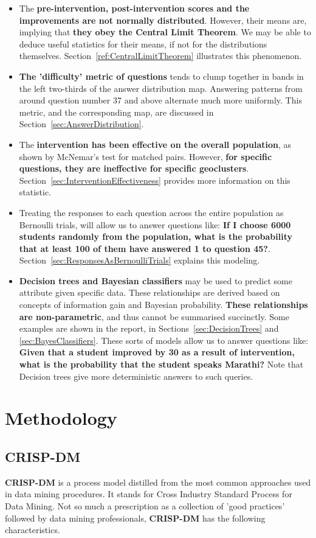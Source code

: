 \documentclass[10pt]{article}
\begin{document}
\begin{itemize}
\item The \textbf{pre-intervention, post-intervention scores and the improvements are not normally distributed}. However, their means are, implying that \textbf{they obey the Central Limit Theorem}. We may be able to deduce useful statistics for their means, if not for the distributions themselves. Section~\ref{ref:CentralLimitTheorem} illustrates this phenomenon.
\item \textbf{The 'difficulty' metric of questions} tends to clump together in bands in the left two-thirds of the answer distribution map. Answering patterns from around question number 37 and above alternate much more uniformly. This metric, and the corresponding map, are discussed in Section~\ref{sec:AnswerDistribution}.
\item The \textbf{intervention has been effective on the overall population}, as shown by McNemar's test for matched pairs. However, \textbf{for specific questions, they are ineffective for specific geoclusters}. Section~\ref{sec:InterventionEffectiveness} provides more information on this statistic.
\item Treating the responses to each question across the entire population as Bernoulli trials, will allow us to answer questions like: \textbf{If I choose 6000 students randomly from the population, what is the probability that at least 100 of them have answered 1 to question 45?}. Section~\ref{sec:ResponsesAsBernoulliTrials} explains this modeling.
\item \textbf{Decision trees and Bayesian classifiers} may be used to predict some attribute given specific data. These relationships are derived based on concepts of information gain and Bayesian probability. \textbf{These relationships are non-parametric}, and thus cannot be summarised succinctly. Some examples are shown in the report, in Sections~\ref{sec:DecisionTrees} and \ref{sec:BayesClassifiers}. These sorts of models allow us to answer questions like: \textbf{Given that a student improved by 30 as a result of intervention, what is the probability that the student speaks Marathi?} Note that Decision trees give more deterministic answers to such queries.
\end{itemize}
\newpage
\section{Methodology}
\subsection{CRISP-DM}
\textbf{CRISP-DM} is a process model distilled from the most common approaches used in data mining procedures. It stands for Cross Industry Standard Process for Data Mining. Not so much a prescription as a collection of 'good practices' followed by data mining professionals, \textbf{CRISP-DM} has the following characteristics.
\end{document}
